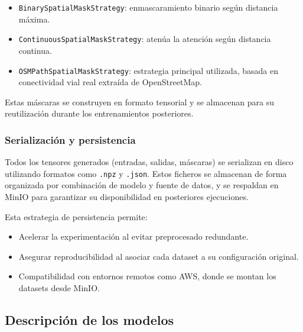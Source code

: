 \begin{itemize}
	\item \texttt{BinarySpatialMaskStrategy}: enmascaramiento binario según distancia máxima.
	\item \texttt{ContinuousSpatialMaskStrategy}: atenúa la atención según distancia continua.
	\item \texttt{OSMPathSpatialMaskStrategy}: estrategia principal utilizada, basada en conectividad vial real extraída de OpenStreetMap.
\end{itemize}

Estas máscaras se construyen en formato tensorial y se almacenan para su reutilización durante los entrenamientos posteriores.


\subsubsection{Serialización y persistencia}

Todos los tensores generados (entradas, salidas, máscaras) se serializan en disco utilizando formatos como \texttt{.npz} y \texttt{.json}. Estos ficheros se almacenan de forma organizada por combinación de modelo y fuente de datos, y se respaldan en MinIO para garantizar su disponibilidad en posteriores ejecuciones.

Esta estrategia de persistencia permite:

\begin{itemize}
	\item Acelerar la experimentación al evitar preprocesado redundante.
	\item Asegurar reproducibilidad al asociar cada dataset a su configuración original.
	\item Compatibilidad con entornos remotos como AWS, donde se montan los datasets desde MinIO.
\end{itemize}

\subsection{Descripción de los modelos}
\label{sec:descripcion_modelos}

